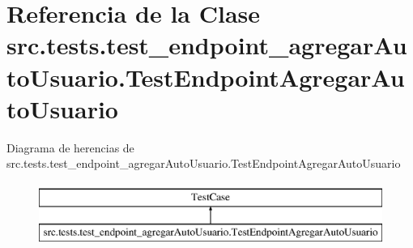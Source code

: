 \hypertarget{classsrc_1_1tests_1_1test__endpoint__agregar_auto_usuario_1_1_test_endpoint_agregar_auto_usuario}{\section{Referencia de la Clase src.\-tests.\-test\-\_\-endpoint\-\_\-agregar\-Auto\-Usuario.\-Test\-Endpoint\-Agregar\-Auto\-Usuario}
\label{classsrc_1_1tests_1_1test__endpoint__agregar_auto_usuario_1_1_test_endpoint_agregar_auto_usuario}
}
Diagrama de herencias de src.\-tests.\-test\-\_\-endpoint\-\_\-agregar\-Auto\-Usuario.\-Test\-Endpoint\-Agregar\-Auto\-Usuario\begin{figure}[H]
\begin{center}
\leavevmode
\includegraphics[height=2.000000cm]{classsrc_1_1tests_1_1test__endpoint__agregar_auto_usuario_1_1_test_endpoint_agregar_auto_usuario}
\end{center}
\end{figure}
